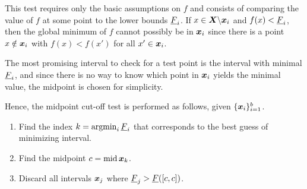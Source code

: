 \documentclass[../global-optimization.tex]{subfiles}
\begin{document}
  This test requires only the basic assumptions on $f$ and 
  consists of comparing the value of $f$ at 
  some point to the lower bounds $\underline F_i$.
  If $x \in \X \backslash \x_i$ and $f(x) < \underline F_i$, 
  then the global minimum of $f$ cannot possibly be in $\x_i$ 
  since there is a point $x \notin \x_i$ with 
  $f(x) < f(x')$ for all $x' \in \x_i$.

  The most promising interval to check for a test point is 
  the interval with minimal $\underline F_i$, and since 
  there is no way to know which point in $\x_i$ yields the minimal value, 
  the midpoint is chosen for simplicity.

  Hence, the midpoint cut-off test is performed as follows, given $\{ \x_i \}_{i=1}^b$.

  \begin{enumerate}
    \item Find the index $k = \mathop{\rm argmin}_i \underline F_i$ that corresponds to the best guess of minimizing interval.
    \item Find the midpoint $c = \Imid \x_k$.
    \item Discard all intervals $\x_j$ where $\underline F_j > \underline F([c,c])$.
  \end{enumerate}
\end{document}
